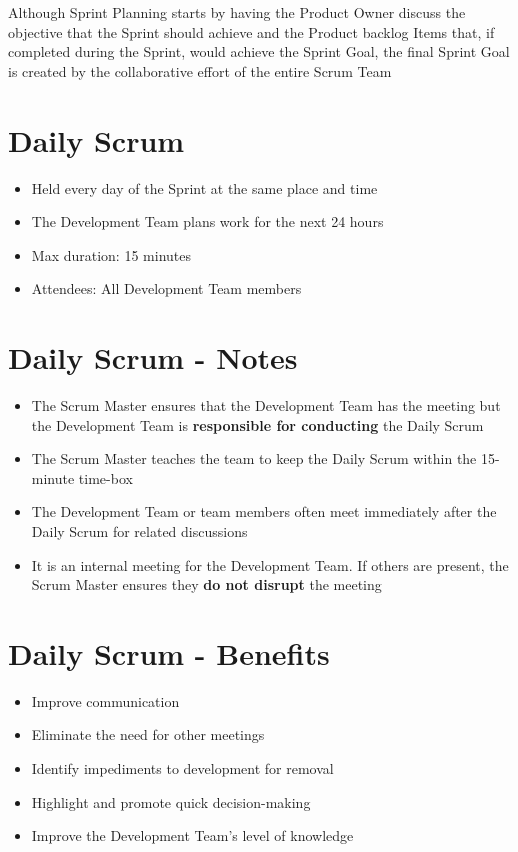 \documentclass[a4paper,11pt,twocolumn]{article}
\begin{document}
\begin{tcolorbox}[colback=black!8!white,colframe=gray!50!black,title=Note,sharp corners,fonttitle=\normalsize\bfseries,fontupper=\normalsize,left=0.7em,right=0.7em]
	Although Sprint Planning starts by having the Product Owner discuss the objective that the Sprint should achieve and the Product backlog Items that, if completed during the Sprint, would achieve the Sprint Goal, the final Sprint Goal is created by the collaborative effort of the entire Scrum Team
\end{tcolorbox}

\section*{Daily Scrum}
\begin{itemize}
    \item Held every day of the Sprint at the same place and time
    \item The Development Team plans work for the next 24 hours
	\item Max duration: 15 minutes
	\item Attendees: All Development Team members
\end{itemize}

\section*{Daily Scrum - Notes}
\begin{itemize}
	\item The Scrum Master ensures that the Development Team has the meeting but the Development Team is \textbf{responsible for conducting} the Daily Scrum
	\item The Scrum Master teaches the team to keep the Daily Scrum within the 15-minute time-box
	\item The Development Team or team members often meet immediately after the Daily Scrum for related discussions
    \item It is an internal meeting for the Development Team. If others are present, the Scrum Master ensures they \textbf{do not disrupt} the meeting
\end{itemize}

\section*{Daily Scrum - Benefits}
\begin{itemize}
	\item Improve communication
	\item Eliminate the need for other meetings
	\item Identify impediments to development for removal
	\item Highlight and promote quick decision-making
	\item Improve the Development Team's level of knowledge
\end{itemize}
\end{document}
